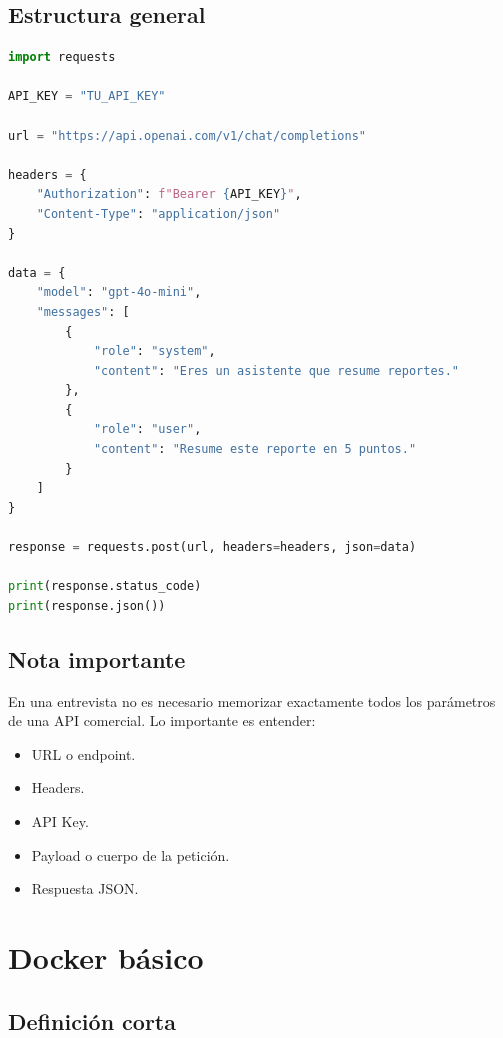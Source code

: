 \documentclass[12pt]{article}
\begin{document}
\subsection{Estructura general}

\begin{lstlisting}[language=Python]
import requests

API_KEY = "TU_API_KEY"

url = "https://api.openai.com/v1/chat/completions"

headers = {
    "Authorization": f"Bearer {API_KEY}",
    "Content-Type": "application/json"
}

data = {
    "model": "gpt-4o-mini",
    "messages": [
        {
            "role": "system",
            "content": "Eres un asistente que resume reportes."
        },
        {
            "role": "user",
            "content": "Resume este reporte en 5 puntos."
        }
    ]
}

response = requests.post(url, headers=headers, json=data)

print(response.status_code)
print(response.json())
\end{lstlisting}

\subsection{Nota importante}

En una entrevista no es necesario memorizar exactamente todos los parámetros de una API comercial. 
Lo importante es entender:

\begin{itemize}
    \item URL o endpoint.
    \item Headers.
    \item API Key.
    \item Payload o cuerpo de la petición.
    \item Respuesta JSON.
\end{itemize}

\section{Docker básico}

\subsection{Definición corta}
\end{document}
